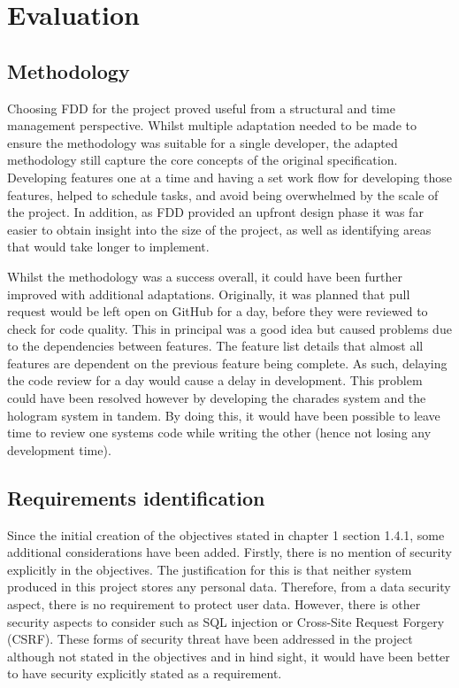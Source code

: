 \chapter{Evaluation}

\section{Methodology}
Choosing FDD for the project proved useful from a structural and time management perspective. Whilst multiple adaptation needed to be made to ensure the methodology was suitable for a single developer, the adapted methodology still capture the core concepts of the original specification. Developing features one at a time and having a set work flow for developing those features, helped to schedule tasks, and avoid being overwhelmed by the scale of the project. In addition, as FDD provided an upfront design phase it was far easier to obtain insight into the size of the project, as well as identifying areas that would take longer to implement.

Whilst the methodology was a success overall, it could have been further improved with additional adaptations. Originally, it was planned that pull request would be left open on GitHub for a day, before they were reviewed to check for code quality. This in principal was a good idea but caused problems due to the dependencies between features. The feature list details that almost all features are dependent on the previous feature being complete. As such, delaying the code review for a day would cause a delay in development. This problem could have been resolved however by developing the charades system and the hologram system in tandem. By doing this, it would have been possible to leave time to review one systems code while writing the other (hence not losing any development time).

\section{Requirements identification}

Since the initial creation of the objectives stated in chapter 1 section 1.4.1, some additional considerations have been added. Firstly, there is no mention of security explicitly in the objectives. The justification for this is that neither system produced in this project stores any personal data. Therefore, from a data security aspect, there is no requirement to protect user data. However, there is other security aspects to consider such as SQL injection or Cross-Site Request Forgery (CSRF). These forms of security threat have been addressed in the project although not stated in the objectives and in hind sight, it would have been better to have security explicitly stated as a requirement.

